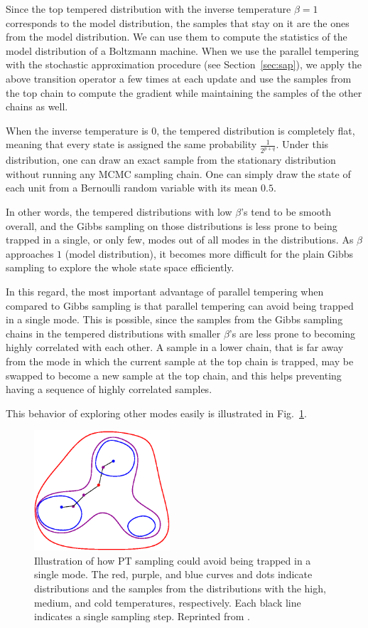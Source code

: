 \documentclass{now}
\begin{document}
Since the top tempered distribution with the inverse temperature $\beta=1$
corresponds to the model distribution, the samples that stay on it are the ones
from the model distribution. We can use them to compute the statistics of the
model distribution of a Boltzmann machine. When we use the parallel tempering
with the stochastic approximation procedure (see Section~\ref{sec:sap}), we
apply the above transition operator a few times at each update and use the
samples from the top chain to compute the gradient while maintaining the samples
of the other chains as well.

When the inverse temperature is $0$, the tempered distribution is completely
flat, meaning that every state is assigned the same probability
$\frac{1}{2^{p+q}}$. Under this distribution, one can draw an exact sample from
the stationary distribution without running any MCMC sampling chain. One can
simply draw the state of each unit from a Bernoulli random variable with its
mean $0.5$. 

In other words, the tempered distributions with low $\beta$'s tend to be smooth
overall, and the Gibbs sampling on those distributions is less prone to being
trapped in a single, or only few, modes out of all modes in the distributions.
As $\beta$ approaches $1$ (model distribution), it becomes more difficult for
the plain Gibbs sampling to explore the whole state space efficiently.

In this regard, the most important advantage of parallel tempering when compared
to Gibbs sampling is that parallel tempering can avoid being trapped in a single
mode.  This is possible, since the samples from the Gibbs sampling chains in the
tempered distributions with smaller $\beta$'s are less prone to becoming highly
correlated with each other.  A sample in a lower chain, that is far away from
the mode in which the current sample at the top chain is trapped, may be swapped
to become a new sample at the top chain, and this helps preventing having a
sequence of highly correlated samples. 

This behavior of exploring other modes easily is illustrated in
Fig.~\ref{fig:pt_escape}.

\begin{figure}[t]
    \centering
    \includegraphics[width=0.45\textwidth]{../figures/pt.eps}
    \caption{Illustration of how PT sampling could avoid being trapped in a
        single mode. The red, purple, and blue curves and dots indicate
        distributions and the samples from the distributions with the high,
        medium, and cold temperatures, respectively. Each black line indicates a
        single sampling step. Reprinted from \citep{Cho2011t}.}
    \label{fig:pt_escape}
\end{figure}
\end{document}
